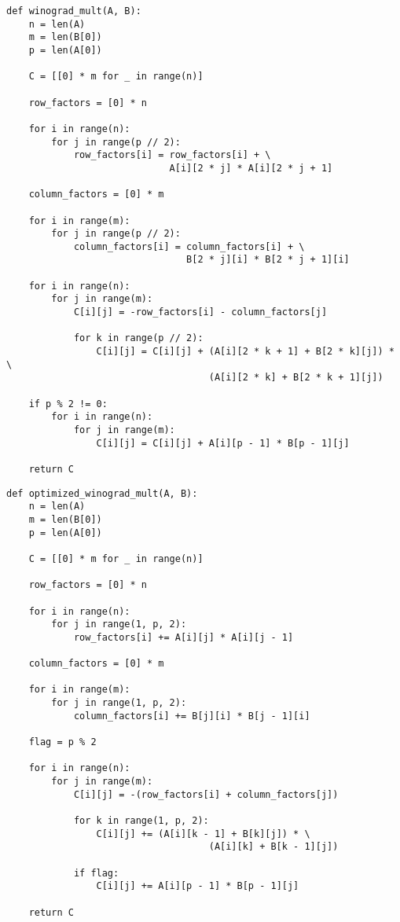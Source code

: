 \begin{center}
\captionsetup{justification=raggedright,singlelinecheck=off}
\begin{lstlisting}[label=lst:winograd,caption=Алгоритм Винограда умножения матриц]
def winograd_mult(A, B):
    n = len(A)
    m = len(B[0])
    p = len(A[0])

    C = [[0] * m for _ in range(n)]

    row_factors = [0] * n

    for i in range(n):
        for j in range(p // 2):
            row_factors[i] = row_factors[i] + \
                             A[i][2 * j] * A[i][2 * j + 1]

    column_factors = [0] * m

    for i in range(m):
        for j in range(p // 2):
            column_factors[i] = column_factors[i] + \
                                B[2 * j][i] * B[2 * j + 1][i]

    for i in range(n):
        for j in range(m):
            C[i][j] = -row_factors[i] - column_factors[j]

            for k in range(p // 2):
                C[i][j] = C[i][j] + (A[i][2 * k + 1] + B[2 * k][j]) * \
                                    (A[i][2 * k] + B[2 * k + 1][j])
    
    if p % 2 != 0:
        for i in range(n):
            for j in range(m):
                C[i][j] = C[i][j] + A[i][p - 1] * B[p - 1][j]
    
    return C
\end{lstlisting}
\end{center}

\begin{center}
\captionsetup{justification=raggedright,singlelinecheck=off}
\begin{lstlisting}[label=lst:optimized,caption=Оптимизированный алгоритм Винограда умножения матриц]
def optimized_winograd_mult(A, B):
    n = len(A)
    m = len(B[0])
    p = len(A[0])

    C = [[0] * m for _ in range(n)]

    row_factors = [0] * n

    for i in range(n):
        for j in range(1, p, 2):
            row_factors[i] += A[i][j] * A[i][j - 1]

    column_factors = [0] * m

    for i in range(m):
        for j in range(1, p, 2):
            column_factors[i] += B[j][i] * B[j - 1][i]

    flag = p % 2

    for i in range(n):
        for j in range(m):
            C[i][j] = -(row_factors[i] + column_factors[j])

            for k in range(1, p, 2):
                C[i][j] += (A[i][k - 1] + B[k][j]) * \
                                    (A[i][k] + B[k - 1][j])
    
            if flag:
                C[i][j] += A[i][p - 1] * B[p - 1][j]
    
    return C
\end{lstlisting}
\end{center}

